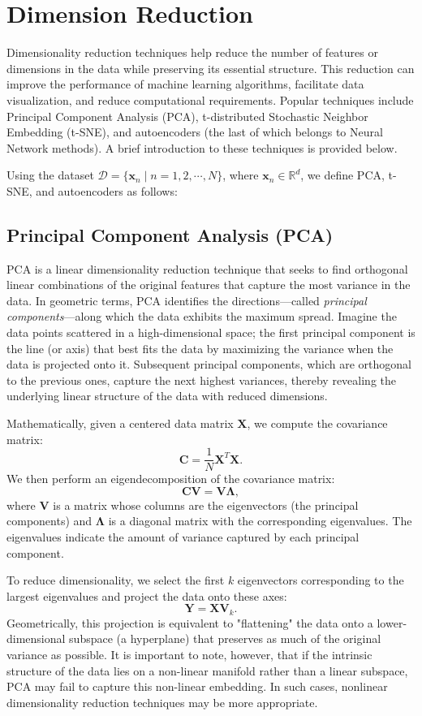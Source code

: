 \documentclass[12pt]{article}
\begin{document}
\section{Dimension Reduction}

Dimensionality reduction techniques help reduce the number of features or dimensions in the data while preserving its essential structure. This reduction can improve the performance of machine learning algorithms, facilitate data visualization, and reduce computational requirements. Popular techniques include Principal Component Analysis (PCA), t-distributed Stochastic Neighbor Embedding (t-SNE), and autoencoders (the last of which belongs to Neural Network methods). A brief introduction to these techniques is provided below.

Using the dataset \(\mathcal{D} = \{ \bm{x}_n \mid n = 1, 2, \cdots, N\}\), where \(\bm{x}_n \in \mathbb{R}^d\), we define PCA, t-SNE, and autoencoders as follows:

\subsection{Principal Component Analysis (PCA)}
PCA is a linear dimensionality reduction technique that seeks to find orthogonal linear combinations of the original features that capture the most variance in the data. In geometric terms, PCA identifies the directions—called \emph{principal components}—along which the data exhibits the maximum spread. Imagine the data points scattered in a high-dimensional space; the first principal component is the line (or axis) that best fits the data by maximizing the variance when the data is projected onto it. Subsequent principal components, which are orthogonal to the previous ones, capture the next highest variances, thereby revealing the underlying linear structure of the data with reduced dimensions.

Mathematically, given a centered data matrix \(\bm{X}\), we compute the covariance matrix:
\[
\bm{C} = \frac{1}{N} \bm{X}^T \bm{X}.
\]
We then perform an eigendecomposition of the covariance matrix:
\[
\bm{C} \bm{V} = \bm{V} \bm{\Lambda},
\]
where \(\bm{V}\) is a matrix whose columns are the eigenvectors (the principal components) and \(\bm{\Lambda}\) is a diagonal matrix with the corresponding eigenvalues. The eigenvalues indicate the amount of variance captured by each principal component.

To reduce dimensionality, we select the first \(k\) eigenvectors corresponding to the largest eigenvalues and project the data onto these axes:
\[
\bm{Y} = \bm{X} \bm{V}_k.
\]
Geometrically, this projection is equivalent to "flattening" the data onto a lower-dimensional subspace (a hyperplane) that preserves as much of the original variance as possible. It is important to note, however, that if the intrinsic structure of the data lies on a non-linear manifold rather than a linear subspace, PCA may fail to capture this non-linear embedding. In such cases, nonlinear dimensionality reduction techniques may be more appropriate.
\end{document}
